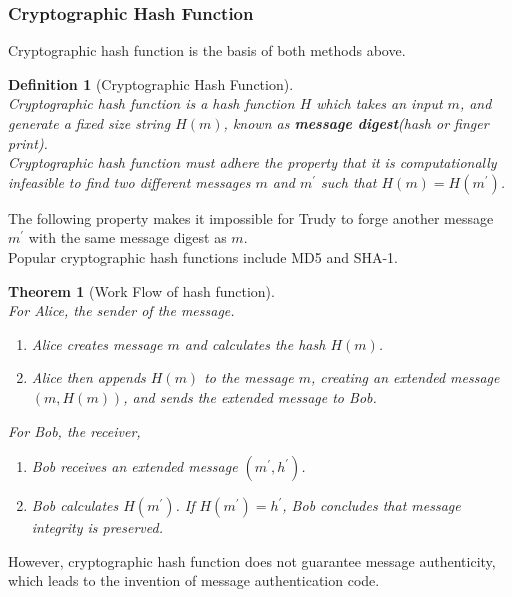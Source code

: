 \documentclass[12pt]{article}
\newtheorem{definition}{Definition}[section]
\newtheorem{theorem}{Theorem}[section]
\theoremstyle{definition}
\begin{document}
\subsubsection{Cryptographic Hash Function}
Cryptographic hash function is the basis of both methods above.
\begin{definition}[Cryptographic Hash Function]
\hfill\\\normalfont Cryptographic hash function is a hash function $H$ which takes an input $m$, and generate a \textit{fixed size} string $H(m)$, known as \textbf{message digest}(hash or finger print).\\
Cryptographic hash function must adhere the property that it is computationally infeasible to find two different messages $m$ and $m^\prime$ such that $H(m)=H(m^\prime)$.
\end{definition}
The following property makes it impossible for Trudy to forge another message $m^\prime$ with the same message digest as $m$.\\
Popular cryptographic hash functions include MD5 and SHA-1.
\begin{theorem}[Work Flow of hash function]
\hfill\\\normalfont For Alice, the sender of the message.
\begin{enumerate}
  \item Alice creates message $m$ and calculates the hash $H(m)$.
  \item Alice then appends $H(m)$ to the message $m$, creating an extended message $(m, H(m))$, and sends the extended message to Bob.
\end{enumerate}
For Bob, the receiver,
\begin{enumerate}
  \item Bob receives an extended message $(m^\prime, h^\prime)$.
  \item Bob calculates $H(m^\prime)$. If $H(m^\prime)=h^\prime$, Bob concludes that message integrity is preserved.
\end{enumerate}
\end{theorem}
However, cryptographic hash function does not guarantee message authenticity, which leads to the invention of message authentication code.
\end{document}
